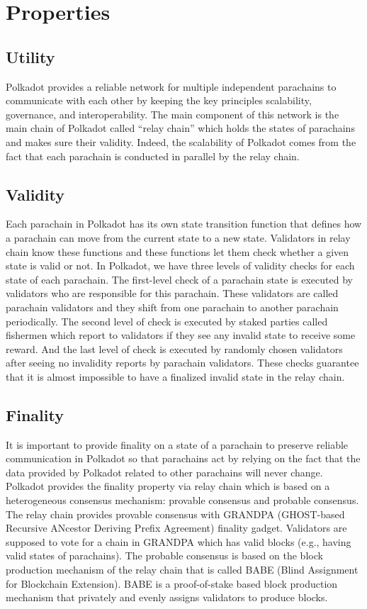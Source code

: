 \section{Properties}

 \subsection{Utility}
 
 Polkadot provides a reliable network for multiple independent parachains to communicate with each other by keeping the key principles scalability, governance, and interoperability.  The main component of this network is the main chain of Polkadot called ``relay chain'' which holds the states of parachains and makes sure their validity. Indeed, the scalability of Polkadot comes from the fact that each parachain is conducted in parallel by the relay chain. 
 
 \subsection{Validity}
Each parachain in Polkadot has its own state transition function that defines how a parachain can move from the current state to a new state.   Validators in relay chain  know these functions and these functions let them  check whether a given state is valid or not.  In Polkadot, we have three levels of validity checks for each state of each parachain. The first-level check of a parachain state is executed by validators who are responsible for this parachain. These validators are called parachain validators and they shift from one parachain to another parachain periodically. The second level of check is executed by staked parties called fishermen which report to validators if they see any invalid state to receive some reward. And the last level of check is executed by randomly chosen validators after seeing no invalidity reports by parachain validators. These checks guarantee that it is almost impossible to have a finalized invalid state in the relay chain.

 \subsection{Finality}
 
 
 It is important to provide finality on a state of a parachain to preserve reliable communication in Polkadot so that parachains act by relying on the fact that the data provided by Polkadot related to other parachains will never change.  Polkadot provides the finality property via relay chain which is based on a heterogeneous consensus mechanism: provable consensus and probable consensus. The relay chain provides provable consensus with GRANDPA (GHOST-based Recursive ANcestor Deriving Prefix Agreement)  finality gadget. Validators are supposed to vote for a chain in GRANDPA  which has valid blocks (e.g., having valid states of parachains). The probable consensus is based on the block production mechanism of the relay chain that is called BABE (Blind Assignment for Blockchain Extension). BABE is a proof-of-stake based block production mechanism that privately and evenly assigns validators to produce blocks.
 

